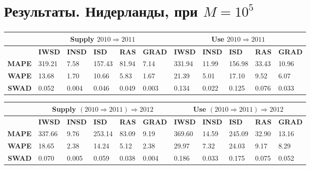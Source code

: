 \documentclass{beamer}
\begin{document}
\section{Результаты. Нидерланды, при $M = 10^5$}
\begin{frame}
	\frametitle{\insertsection}
	
	\renewcommand{\arraystretch}{1.5}
	\tiny{
	\begin{tabular}{|r|m{0.5cm}m{0.5cm}m{0.5cm}m{0.5cm}m{0.6cm}|m{0.5cm}m{0.5cm}m{0.5cm}m{0.5cm}m{0.6cm}|}
		\multicolumn{1}{c}{} & \multicolumn{5}{c}{Supply $2010 \Rightarrow 2011$} & \multicolumn{5}{c}{Use $2010 \Rightarrow 2011$}\\
		\hline
		& \textbf{IWSD} & \textbf{INSD} & \textbf{ISD} & \textbf{RAS} & \textbf{GRAD} & \textbf{IWSD} & \textbf{INSD} & \textbf{ISD} & \textbf{RAS} & \textbf{GRAD} \\
		\hline
		\textbf{MAPE} & 319.21 & 7.58 & 157.43 & 81.94 & 7.14 & 331.94 & 11.99 & 156.98 & 33.43 & 10.96 \\
		\textbf{WAPE} & 13.68 & 1.70 & 10.66 & 5.83 & 1.67 & 21.39 & 5.01 & 17.10 & 9.52 & 6.07 \\
		\textbf{SWAD} & 0.052 & 0.004 & 0.046 & 0.049 & 0.003 & 0.134 & 0.022 & 0.125 & 0.076 & 0.033 \\
		\hline
	\end{tabular}
	}
	\bigskip
	
	\tiny{
	\begin{tabular}{|r|m{0.5cm}m{0.5cm}m{0.5cm}m{0.5cm}m{0.6cm}|m{0.5cm}m{0.5cm}m{0.5cm}m{0.5cm}m{0.6cm}|}
		\multicolumn{1}{c}{} & \multicolumn{5}{c}{Supply $(2010 \Rightarrow 2011) \Rightarrow 2012$} & \multicolumn{5}{c}{Use $(2010 \Rightarrow 2011) \Rightarrow 2012$}\\
		\hline
		& \textbf{IWSD} & \textbf{INSD} & \textbf{ISD} & \textbf{RAS} & \textbf{GRAD} & \textbf{IWSD} & \textbf{INSD} & \textbf{ISD} & \textbf{RAS} & \textbf{GRAD} \\
		\hline
		\textbf{MAPE} & 337.66 & 9.76 & 253.14 & 83.09 & 9.19 & 369.60 & 14.59 & 245.09 & 32.90 & 13.16 \\
		\textbf{WAPE} & 18.65 & 2.38 & 14.24 & 5.12 & 2.38 & 29.97 & 7.32 & 24.03 & 9.17 & 8.29 \\
		\textbf{SWAD} & 0.070 & 0.005 & 0.059 & 0.038 & 0.004 & 0.186 & 0.033 & 0.175 & 0.075 & 0.052 \\
		\hline
	\end{tabular}
	}
	
\end{frame}
\end{document}
